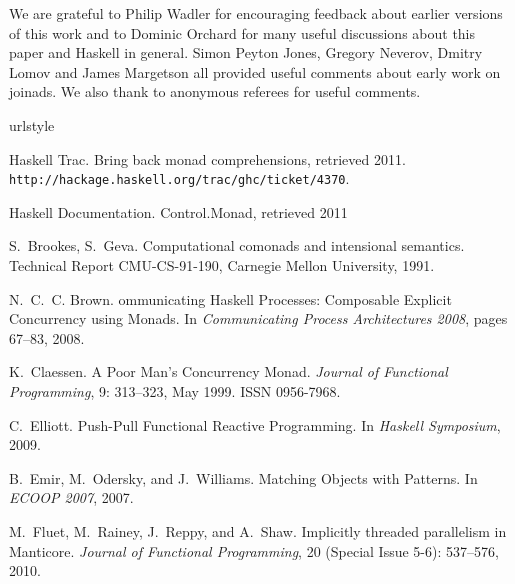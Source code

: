 \documentclass{sigplanconf}
\begin{document}

\acks
We are grateful to Philip Wadler for encouraging feedback about earlier versions of this work and to 
Dominic Orchard for many useful discussions about this paper and Haskell in general. Simon Peyton 
Jones, Gregory Neverov, Dmitry Lomov and James Margetson all provided useful comments about early 
work on joinads. We also thank to anonymous referees for useful comments.



\begin{thebibliography}{37}
\raggedright
\providecommand{\natexlab}[1]{#1}
\providecommand{\url}[1]{\texttt{#1}}
\expandafter\ifx\csname urlstyle\endcsname\relax
  \providecommand{\doi}[1]{doi: #1}\else
  \providecommand{\doi}{doi: \begingroup \urlstyle{rm}\Url}\fi

Haskell Trac.
\newblock Bring back monad comprehensions, retrieved 2011.
\url{http://hackage.haskell.org/trac/ghc/ticket/4370}.

Haskell Documentation.
\newblock Control.Monad, retrieved 2011

S.~Brookes, S.~Geva.
\newblock Computational comonads and intensional semantics.
\newblock Technical Report CMU-CS-91-190, Carnegie Mellon University, 1991.

N.~C.~C. Brown.
ommunicating {H}askell {P}rocesses: {C}omposable {E}xplicit
  {C}oncurrency using {M}onads.
\newblock In \emph{{C}ommunicating {P}rocess {A}rchitectures 2008}, pages
  67--83, 2008.

K.~Claessen.
\newblock A Poor Man's Concurrency Monad.
\newblock \emph{Journal of Functional Programming}, 9: 313--323, May
  1999.
\newblock ISSN 0956-7968.

C.~Elliott.
\newblock Push-Pull Functional Reactive Programming.
\newblock In \emph{Haskell Symposium}, 2009.

B.~Emir, M.~Odersky, and J.~Williams.
\newblock Matching Objects with Patterns.
\newblock In \emph{ECOOP 2007}, 2007.

M.~Fluet, M.~Rainey, J.~Reppy, and A.~Shaw.
\newblock Implicitly threaded parallelism in {M}anticore.
\newblock \emph{Journal of Functional Programming}, 20 (Special Issue
  5-6): 537--576, 2010.


\end{thebibliography}
\end{document}
